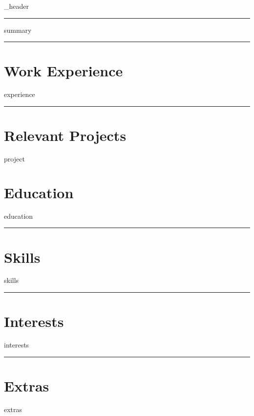 \documentclass[letter,10pt]{article}
\author{Guilherme Lopes}
\begin{document}
{_header}
\vspace*{10pt}
\hrule
\vspace*{6pt}

{summary}
\vspace*{6pt}
\hrule

\section{\textbf{Work Experience}}
\vspace*{3pt}
{experience}
\vspace*{6pt}
\hrule

\section{\textbf{Relevant Projects}}
\vspace*{3pt}
{project}
\vspace*{32pt}

\section{\textbf{Education}}
\vspace*{3pt}
{education}
\hrule
\vspace*{6pt}

\section{\textbf{Skills}}
\vspace*{3pt}
{skills}
\vspace*{6pt}
\hrule

\section{\textbf{Interests}}
\vspace*{3pt}
{interests}
\vspace*{12pt}
\hrule

\section{\textbf{Extras}}
\vspace*{3pt}
{extras}
\vspace*{6pt}
\end{document}
